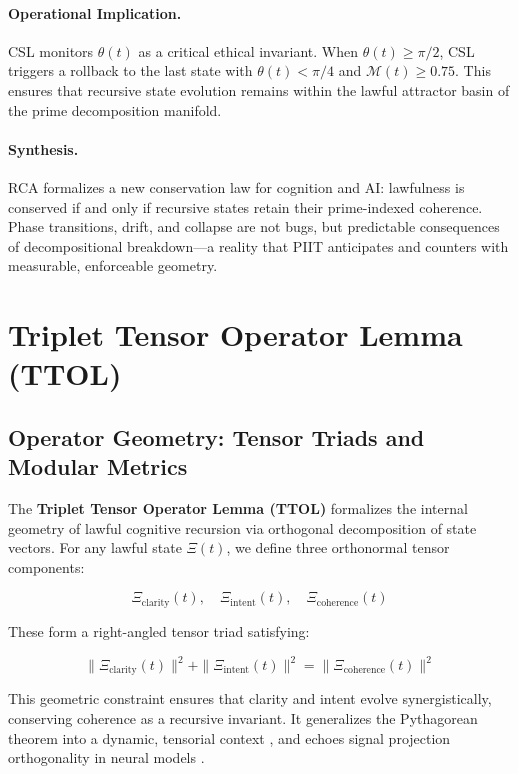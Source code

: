 \documentclass[12]{amsart}
\theoremstyle{plain}
\begin{document}
\paragraph{Operational Implication.}
CSL monitors $\theta(t)$ as a critical ethical invariant. When $\theta(t) \geq \pi/2$, CSL triggers a rollback to the last state with $\theta(t) < \pi/4$ and $\mathcal{M}(t) \geq 0.75$. This ensures that recursive state evolution remains within the lawful attractor basin of the prime decomposition manifold.

\paragraph{Synthesis.}
RCA formalizes a new conservation law for cognition and AI: lawfulness is conserved if and only if recursive states retain their prime-indexed coherence. Phase transitions, drift, and collapse are not bugs, but predictable consequences of decompositional breakdown—a reality that PIIT anticipates and counters with measurable, enforceable geometry.


\section{Triplet Tensor Operator Lemma (TTOL)}

\subsection{Operator Geometry: Tensor Triads and Modular Metrics}

The \textbf{Triplet Tensor Operator Lemma (TTOL)} formalizes the internal geometry of lawful cognitive recursion via orthogonal decomposition of state vectors. For any lawful state $\Xi(t)$, we define three orthonormal tensor components:

\begin{equation}
\Xi_{\text{clarity}}(t), \quad \Xi_{\text{intent}}(t), \quad \Xi_{\text{coherence}}(t)
\end{equation}

These form a right-angled tensor triad satisfying:

\begin{equation}
\| \Xi_{\text{clarity}}(t) \|^2 + \| \Xi_{\text{intent}}(t) \|^2 = \| \Xi_{\text{coherence}}(t) \|^2
\end{equation}

This geometric constraint ensures that clarity and intent evolve synergistically, conserving coherence as a recursive invariant. It generalizes the Pythagorean theorem into a dynamic, tensorial context \cite{arnold1989mathematical}, and echoes signal projection orthogonality in neural models \cite{olshausen1996emergence}.
\end{document}
